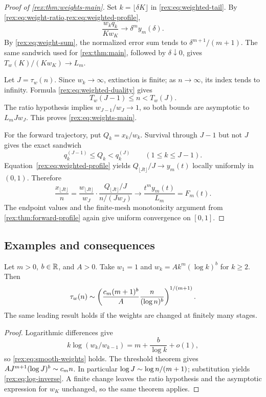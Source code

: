 \begin{proof}[Proof of \cref{rex:thm:weights-main}]
Set $k=\lfloor\delta K\rfloor$ in \cref{rex:eq:weighted-tail}.
By \cref{rex:eq:weight-ratio,rex:eq:weighted-profile},
\[
 \frac{w_kq_k}{K w_K}\longrightarrow\delta^m y_m(\delta).
\]
By \cref{rex:eq:weight-sum}, the normalized error sum tends to
$\delta^{m+1}/(m+1)$. The same sandwich used for
\cref{rex:thm:main}, followed by $\delta\downarrow0$, gives
$T_w(K)/(K w_K)\to L_m$.

Let $J=\tau_w(n)$. Since $w_k\to\infty$, extinction is finite;
as $n\to\infty$, its index tends to infinity. Formula
\cref{rex:eq:weighted-duality} gives
\[
 T_w(J-1)\leq n<T_w(J).
\]
The ratio hypothesis implies $w_{J-1}/w_J\to1$, so both bounds are
asymptotic to $L_mJw_J$. This proves \cref{rex:eq:weights-main}.

For the forward trajectory, put $Q_k=x_k/w_k$. Survival through
$J-1$ but not $J$ gives the exact sandwich
\[
 q_k^{(J-1)}\leq Q_k<q_k^{(J)}\qquad(1\leq k\leq J-1).
\]
Equation~\eqref{rex:eq:weighted-profile} yields $Q_{\lfloor Jt\rfloor}/J
\to y_m(t)$ locally uniformly in $(0,1)$. Therefore
\[
 \frac{x_{\lfloor Jt\rfloor}}n
 =\frac{w_{\lfloor Jt\rfloor}}{w_J}\cdot
   \frac{Q_{\lfloor Jt\rfloor}/J}{n/(Jw_J)}
 \longrightarrow\frac{t^m y_m(t)}{L_m}=F_m(t).
\]
The endpoint values and the finite-mesh monotonicity argument from
\cref{rex:thm:forward-profile} again give uniform convergence on $[0,1]$.
\end{proof}

\subsection{Examples and consequences}

\begin{corollary}\label{rex:cor:log-weights}
Let $m>0$, $b\in\mathbb R$, and $A>0$. Take $w_1=1$ and
$w_k=A k^m(\log k)^b$ for $k\geq2$. Then
\begin{equation}\label{rex:eq:log-inverse}
 \tau_w(n)\mathrel{\sim}
 \left(\frac{c_m(m+1)^b}{A}
              \frac{n}{(\log n)^b}\right)^{1/(m+1)}.
\end{equation}
The same leading result holds if the weights are changed at finitely
many stages.
\end{corollary}

\begin{proof}
Logarithmic differences give
\[
 k\log(w_k/w_{k-1})=m+\frac{b}{\log k}+o(1),
\]
so \cref{rex:eq:smooth-weights} holds. The threshold theorem gives
$A J^{m+1}(\log J)^b\mathrel{\sim} c_m n$.
In particular $\log J\mathrel{\sim}\log n/(m+1)$; substitution yields
\cref{rex:eq:log-inverse}. A finite change leaves the ratio hypothesis
and the asymptotic expression for $w_K$ unchanged, so the same theorem
applies.
\end{proof}

